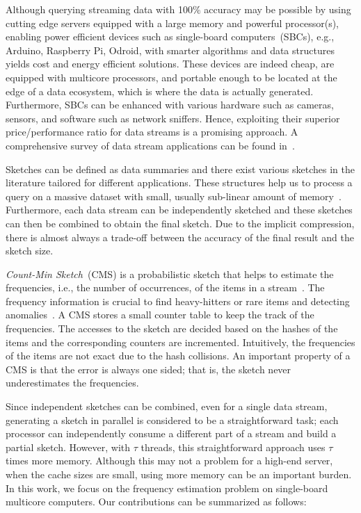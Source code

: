 \documentclass[runningheads]{llncs}
\begin{document}
Although querying streaming data with 100$\%$ accuracy may be possible by using cutting edge servers equipped with a large memory and powerful processor(s), enabling power efficient devices such as single-board computers~(SBCs), e.g., Arduino, Raspberry Pi, Odroid, with smarter algorithms and data structures yields cost and energy efficient solutions. These devices are indeed cheap, are equipped with multicore processors, and portable enough to be located at the edge of a data ecosystem, which is where the data is actually generated. Furthermore, SBCs can be enhanced with various hardware such as cameras, sensors, and software such as network sniffers. Hence, exploiting their superior price/performance ratio for data streams is a promising approach. A comprehensive survey of data stream applications can be found in~\cite{muthukrishnan2005}. 
      
Sketches can be defined as data summaries and there exist various sketches in the literature tailored for different applications. These structures help us to process a query on a massive dataset with small, usually sub-linear amount of memory~\cite{alon1996,charikar2002,dobra2002,gilbert2002}. Furthermore, each data stream can be independently sketched and  these sketches can then be combined to obtain the final sketch. Due to the implicit compression, there is almost always a trade-off between the accuracy of the final result and the sketch size. %

{\it Count-Min Sketch}~(CMS) is a probabilistic sketch that helps to estimate the frequencies, i.e., the number of occurrences, of the items in a stream~\cite{cormode2005}. The frequency  information is crucial to find heavy-hitters or rare items and detecting anomalies~\cite{cormode2003,cormode2005}. A CMS stores a small counter table to keep the track of the frequencies. The accesses to the sketch are decided based on the hashes of the items and the corresponding counters are incremented. Intuitively, the frequencies of the items are not exact due to the hash collisions. An important property of a CMS is that the error is always one sided; that is, the sketch never underestimates the frequencies. 

Since independent sketches can be combined, even for a single data stream, generating a sketch in parallel is considered to be a straightforward task; each processor can independently consume a different part of a stream and build a partial sketch. However, with $\tau$ threads, this straightforward approach uses $\tau$ times more memory. Although this may not a problem for a high-end server, when the cache sizes are small, using more memory can be an important burden. In this work, we focus on the frequency estimation problem on single-board multicore computers. Our contributions can be summarized as follows:
\end{document}
